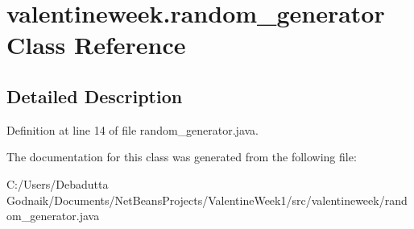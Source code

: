 \hypertarget{classvalentineweek_1_1random__generator}{}\section{valentineweek.\+random\+\_\+generator Class Reference}
\label{classvalentineweek_1_1random__generator}


\subsection{Detailed Description}


Definition at line 14 of file random\+\_\+generator.\+java.



The documentation for this class was generated from the following file\+:\begin{DoxyCompactItemize}
\item 
C\+:/\+Users/\+Debadutta Godnaik/\+Documents/\+Net\+Beans\+Projects/\+Valentine\+Week1/src/valentineweek/random\+\_\+generator.\+java\end{DoxyCompactItemize}
